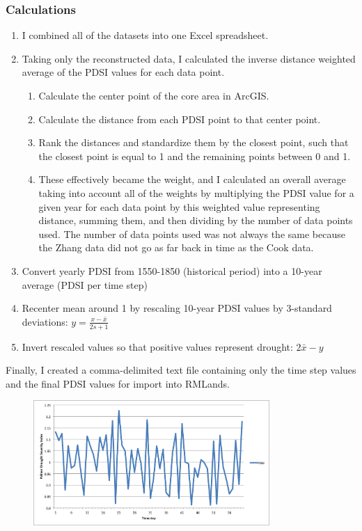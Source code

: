 \subsubsection{Calculations}
\begin{enumerate}
\item I combined all of the datasets into one Excel spreadsheet. 
\item Taking only the reconstructed data, I calculated the inverse distance weighted average of the PDSI values for each data point. 
\begin{enumerate}
\item Calculate the center point of the core area in ArcGIS.
\item Calculate the distance from each PDSI point to that center point. 
\item Rank the distances and standardize them by the closest point, such that the closest point is equal to 1 and the remaining points between 0 and 1. 
\item These effectively became the weight, and I calculated an overall average taking into account all of the weights by multiplying the PDSI value for a given year for each data point by this weighted value representing distance, summing them, and then dividing by the number of data points used. The number of data points used was not always the same because the Zhang data did not go as far back in time as the Cook data. 
\end{enumerate}
\item Convert yearly PDSI from 1550-1850 (historical period) into a 10-year average (PDSI per time step)
\item Recenter mean around 1 by rescaling 10-year PDSI values by 3-standard deviations: $y = \frac{x - \bar{x}}{2s + 1}$
\item Invert rescaled values so that positive values represent drought: $2\bar{x} - y$
\end{enumerate}

Finally, I created a comma-delimited text file containing only the time step values and the final PDSI values for import into RMLands.

\begin{figure}[h]
\centering
\includegraphics[width=0.8\textwidth]{PDSIpic}
\end{figure}

